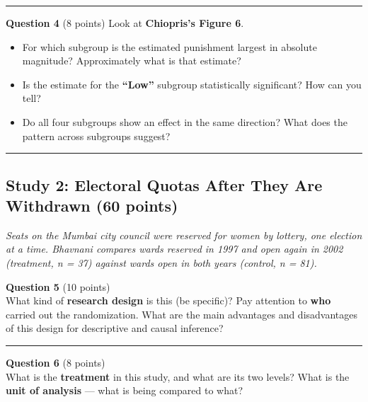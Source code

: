 \documentclass[
]{article}
\providecommand{\tightlist}{%
  \setlength{\itemsep}{0pt}\setlength{\parskip}{0pt}}
\begin{document}
\vspace{4cm}

\begin{center}\rule{0.5\linewidth}{0.5pt}\end{center}

\textbf{Question 4} (8 points) Look at \textbf{Chiopris's Figure 6}.

\begin{itemize}
\tightlist
\item
  For which subgroup is the estimated punishment largest in absolute
  magnitude? Approximately what is that estimate?
\item
  Is the estimate for the \textbf{``Low''} subgroup statistically
  significant? How can you tell?
\item
  Do all four subgroups show an effect in the same direction? What does
  the pattern across subgroups suggest?
\end{itemize}

\vspace{4cm}

\begin{center}\rule{0.5\linewidth}{0.5pt}\end{center}

\subsection{Study 2: Electoral Quotas After They Are Withdrawn (60
points)}\label{study-2-electoral-quotas-after-they-are-withdrawn-60-points}

\emph{Seats on the Mumbai city council were reserved for women by
lottery, one election at a time. Bhavnani compares wards reserved in
1997 and open again in 2002 (treatment, n = 37) against wards open in
both years (control, n = 81).}

\textbf{Question 5} (10 points)\\
What kind of \textbf{research design} is this (be specific)? Pay
attention to \textbf{who} carried out the randomization. What are the
main advantages and disadvantages of this design for descriptive and
causal inference?

\vspace{4cm}

\begin{center}\rule{0.5\linewidth}{0.5pt}\end{center}

\textbf{Question 6} (8 points)\\
What is the \textbf{treatment} in this study, and what are its two
levels? What is the \textbf{unit of analysis} --- what is being compared
to what?
\end{document}
